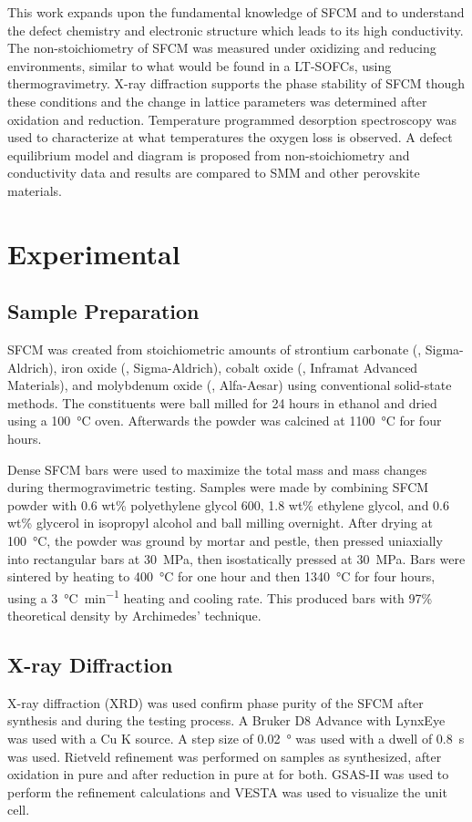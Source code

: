     This work expands upon the fundamental knowledge of SFCM and to understand the defect chemistry and electronic structure which leads to its high conductivity.
    The non-stoichiometry of SFCM was measured under oxidizing and reducing environments, similar to what would be found in a LT-SOFCs, using thermogravimetry.
    X-ray diffraction supports the phase stability of SFCM though these conditions and the change in lattice parameters was determined after oxidation and reduction.
    Temperature programmed desorption spectroscopy was used to characterize at what temperatures the oxygen loss is observed.
    A defect equilibrium model and diagram is proposed from non-stoichiometry and conductivity data and results are compared to SMM and other perovskite materials.

\section{Experimental}
    \subsection{Sample Preparation}
        SFCM was created from stoichiometric amounts of strontium carbonate (, Sigma-Aldrich), iron oxide (, Sigma-Aldrich), cobalt oxide (, Inframat Advanced Materials), and molybdenum oxide (, Alfa-Aesar) using conventional solid-state methods.
        The constituents were ball milled for 24 hours in ethanol and dried using a \SI{100}{\celsius} oven.
        Afterwards the powder was calcined at \SI{1100}{\celsius} for four hours.

        Dense SFCM bars were used to maximize the total mass and mass changes during thermogravimetric testing.
        Samples were made by combining SFCM powder with 0.6 wt\% polyethylene glycol 600, 1.8 wt\% ethylene glycol, and 0.6 wt\% glycerol in isopropyl alcohol and ball milling overnight.
        After drying at \SI{100}{\celsius}, the powder was ground by mortar and pestle, then pressed uniaxially into rectangular bars at \SI{30}{\mega\pascal}, then isostatically pressed at \SI{30}{\mega\pascal}.
        Bars were sintered by heating to \SI{400}{\celsius} for one hour and then \SI{1340}{\celsius} for four hours, using a \SI{3}{\celsius\per\minute} heating and cooling rate.
        This produced bars with 97\% theoretical density by Archimedes' technique.

    \subsection{X-ray Diffraction}
        X-ray diffraction (XRD) was used confirm phase purity of the SFCM after synthesis and during the testing process.
        A Bruker D8 Advance with LynxEye was used with a Cu K\textsubscript{\textalpha{}} source.
        A step size of \SI{0.02}{\degree} was used with a dwell of \SI{0.8}{\second} was used.
        Rietveld refinement was performed on samples as synthesized, after oxidation in pure  and after reduction in pure  at  for both.
        GSAS-II was used to perform the refinement calculations and VESTA was used to visualize the unit cell.\cite{Toby2013,Momma2011}

